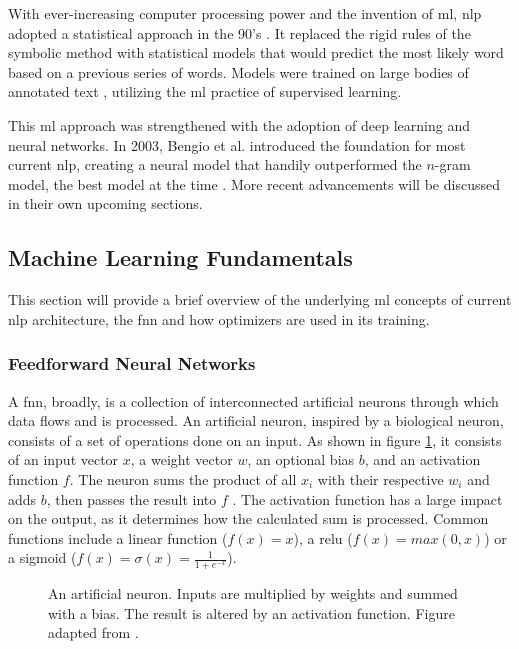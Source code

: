 With ever-increasing computer processing power and the invention of \ac{ml}, \ac{nlp} adopted a statistical approach in the 90's \cite{Nadkarni.2011}.
It replaced the rigid rules of the symbolic method with statistical models that would predict the most likely word based on a previous series of words.
Models were trained on large bodies of annotated text \cite{Nadkarni.2011,Manning.1999}, utilizing the \ac{ml} practice of supervised learning.

This \ac{ml} approach was strengthened with the adoption of deep learning and neural networks.
In 2003, Bengio et al. introduced the foundation for most current \ac{nlp}, creating a neural model that handily outperformed the $n$-gram model, the best model at the time \cite{Bengio.2003}.
More recent advancements will be discussed in their own upcoming sections.

\subsection{Machine Learning Fundamentals}
\label{sec:ml}
This section will provide a brief overview of the underlying \ac{ml} concepts of current \ac{nlp} architecture, the \ac{fnn} and how optimizers are used in its training.

\subsubsection{Feedforward Neural Networks}
\label{sec:fnn}
A \ac{fnn}, broadly, is a collection of interconnected artificial neurons through which data flows and is processed.
An artificial neuron, inspired by a biological neuron, consists of a set of operations done on an input.
As shown in figure \ref{fig:neuron}, it consists of an input vector $x$, a weight vector $w$, an optional bias $b$, and an activation function $f$.
The neuron sums the product of all $x_i$ with their respective $w_i$ and adds $b$, then passes the result into $f$ \cite{Jurafsky.2024}.
The activation function has a large impact on the output, as it determines how the calculated sum is processed.
Common functions include a linear function ($f(x) = x$), a \ac{relu} ($f(x) = max(0,x)$) or a sigmoid ($f(x) = \sigma(x) = \frac{1}{1+e^{-x}}$).

\begin{figure}
    \centering
    \caption{An artificial neuron. Inputs are multiplied by weights and summed with a bias. The result is altered by an activation function. Figure adapted from \cite{Jurafsky.2024}.}
    \label{fig:neuron}
\end{figure}


